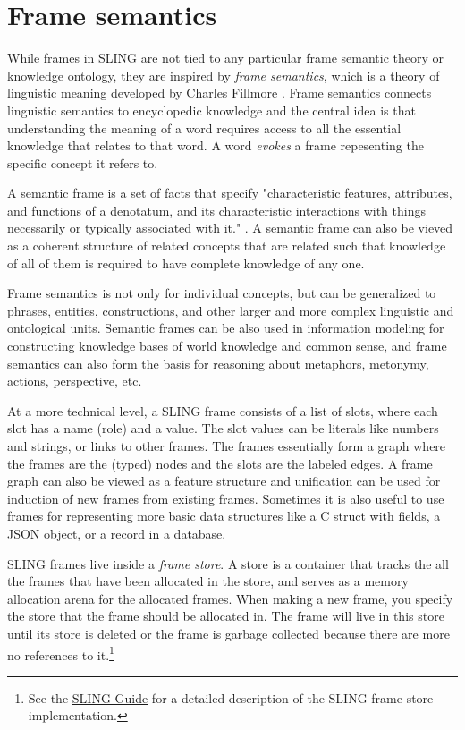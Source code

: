 \documentclass[11pt,a4paper]{article}
\begin{document}
\section{Frame semantics}
\label{sec:framesem}

While frames in SLING are not tied to any particular frame semantic theory or
knowledge ontology, they are inspired by \emph{frame semantics}, which is a
theory of linguistic meaning developed by Charles Fillmore \cite{fillmore1982}.
Frame semantics connects linguistic semantics to encyclopedic knowledge and the
central idea is that understanding the meaning of a word requires access to all
the essential knowledge that relates to that word. A word \emph{evokes} a frame
repesenting the specific concept it refers to.

A semantic frame is a set of facts that specify "characteristic
features, attributes, and functions of a denotatum, and its characteristic
interactions with things necessarily or typically associated with it." \cite{alan2001}.
A semantic frame can also be vieved as a coherent structure of related concepts
that are related such that knowledge of all of them is required to have
complete knowledge of any one.

Frame semantics is not only for individual concepts, but can be generalized
to phrases, entities, constructions, and other larger and more complex linguistic
and ontological units. Semantic frames can be also used in information modeling
for constructing knowledge bases of world knowledge and common sense, and frame
semantics can also form the basis for reasoning about metaphors, metonymy,
actions, perspective, etc.

At a more technical level, a SLING frame consists of a list of slots, where each
slot has a name (role) and a value. The slot values can be literals like numbers
and strings, or links to other frames. The frames essentially form a graph where
the frames are the (typed) nodes and the slots are the labeled edges. A frame
graph can also be viewed as a feature structure \cite{carpenter2005} and
unification can be used for induction of new frames from existing frames.
Sometimes it is also useful to use frames for representing more basic data
structures like a C struct with fields, a JSON object, or a record in a
database.

SLING frames live inside a \emph{frame store}. A store is a container that
tracks the all the frames that have been allocated in the store, and serves as a
memory allocation arena for the allocated frames. When making a new frame, you
specify the store that the frame should be allocated in. The frame will live in
this store until its store is deleted or the frame is garbage collected because
there are more no references to it.\footnote{See the \href{https://github.com/google/sling/blob/master/frame/README.md}{SLING Guide}
for a detailed description of the SLING frame store implementation.}
\end{document}
